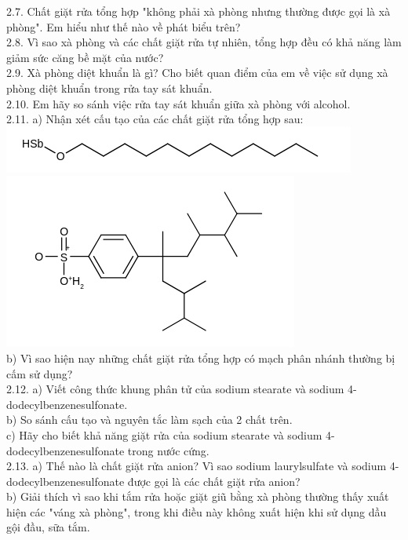 \documentclass[10pt]{article}
\begin{document}
2.7. Chất giặt rửa tổng hợp "không phải xà phòng nhưng thường được gọi là xà phòng". Em hiểu như thế nào về phát biểu trên?\\
2.8. Vì sao xà phòng và các chất giặt rửa tự nhiên, tổng hợp đều có khả năng làm giảm sức căng bề mặt của nước?\\
2.9. Xà phòng diệt khuẩn là gì? Cho biết quan điểm của em về việc sử dụng xà phòng diệt khuẩn trong rửa tay sát khuẩn.\\
2.10. Em hãy so sánh việc rửa tay sát khuẩn giữa xà phòng với alcohol.\\
2.11. a) Nhận xét cấu tạo của các chất giặt rửa tổng hợp sau:\\
\includegraphics{smile-9a445740653245117b6a4c994fec17ba6c853366}\\
\includegraphics{smile-090c8219ef8a4a90a829b50c8202dd8af7af7ec3}\\
b) Vì sao hiện nay những chất giặt rửa tổng hợp có mạch phân nhánh thường bị cấm sử dụng?\\
2.12. a) Viết công thức khung phân tử của sodium stearate và sodium 4-dodecylbenzenesulfonate.\\
b) So sánh cấu tạo và nguyên tắc làm sạch của 2 chất trên.\\
c) Hãy cho biết khả năng giặt rửa của sodium stearate và sodium 4-dodecylbenzenesulfonate trong nước cứng.\\
2.13. a) Thế nào là chất giặt rửa anion? Vì sao sodium laurylsulfate và sodium 4-dodecylbenzenesulfonate được gọi là các chất giặt rửa anion?\\
b) Giải thích vì sao khi tắm rửa hoặc giặt giũ bằng xà phòng thường thấy xuất hiện các "váng xà phòng", trong khi điều này không xuất hiện khi sử dụng dầu gội đầu, sữa tắm.\\
\end{document}

